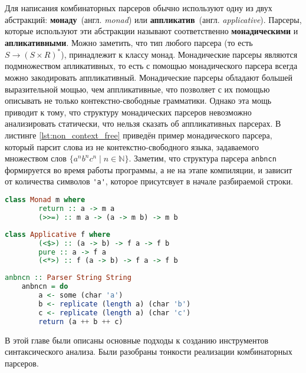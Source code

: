 \documentclass[times]{itmo-student-thesis}
\begin{document}
Для написания комбинаторных парсеров обычно используют одну из двух абстракций: \textbf{монаду}~(англ.
\textit{monad})	или \textbf{аппликатив}~(англ. \textit{applicative}). Парсеры, которые используют эти
абстракции называют соответственно  \textbf{монадическими} и \textbf{апликативными}. Можно заметить, что тип любого
парсера (то есть $S \rightarrow (S \times R)^*$),  принадлежит к классу монад\cite{hutton_monadic_nodate}. Монадические парсеры
являются подмножеством апликативных, то есть с помощью монадического парсера всегда можно закодировать аппликативный.
Монадические парсеры обладают большей выразительной мощью, чем аппликативные, что позволяет с их помощью описывать не
только	    контекстно-свободные грамматики. Однако эта мощь приводит к тому, что структуру монадических парсеров
невозможно анализировать статически, что нельзя сказать об аппликативных парсерах. В листинге \ref{lst:non_context_free}
приведён пример монадического парсера,	который парсит слова из не контекстно-свободного языка, задаваемого множеством
слов $\{a^nb^nc^n \mid n \in \mathbb{N}\}$. Заметим, что структура парсера \lstinline{anbncn} формируется во время работы
программы, а не на этапе компиляции, и зависит от количества символов \lstinline{'a'}, которое присутсвует в
начале разбираемой строки.

\begin{lstlisting}[language=Haskell,float=!h,caption={Класс монад в Haskell},label={lst:monad_typeclass}]
    class Monad m where
        return :: a -> m a
        (>>=) :: m a -> (a -> m b) -> m b
\end{lstlisting}

\begin{lstlisting}[language=Haskell,caption={Класс аппликативов в Haskell},label={lst:applicative_typeclass}]
    class Applicative f where
        (<$>) :: (a -> b) -> f a -> f b
        pure :: a -> f a
        (<*>) :: f (a -> b) -> f a -> f b
\end{lstlisting}

\begin{lstlisting}[language=Haskell,caption={Монадический парсер для не КС языка},label={lst:non_context_free}]
    anbncn :: Parser String String
    anbncn = do
        a <- some (char 'a')
        b <- replicate (length a) (char 'b')
        c <- replicate (length a) (char 'c')
        return (a ++ b ++ c)
\end{lstlisting}

\chapterconclusion

В этой главе были описаны основные подходы к созданию инструментов синтаксического анализа. Были разобраны тонкости реализации 
комбинаторных парсеров.
\end{document}
